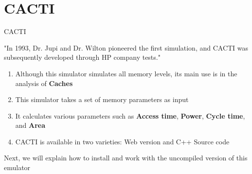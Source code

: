 \documentclass{beamer}
\begin{document}
\section{CACTI}
\begin{frame}{CACTI}
	
	"In 1993, Dr. Jupi and Dr. Wilton pioneered the first simulation, and CACTI was subsequently developed through HP company tests."
	
	\begin{enumerate}
		\item Although this simulator simulates all memory levels, its main use is in the analysis of \textbf{Caches}
		
		\item This simulator takes a set of memory parameters as input
		\item It calculates various parameters such as \textbf{Access time}, \textbf{Power}, \textbf{Cycle time}, and \textbf{Area}
		\item CACTI is available in two varieties: Web version and C++ Source code
	\end{enumerate}
	
	Next, we will explain how to install and work with the uncompiled version of this emulator

%
%        
%        
\end{frame}
\end{document}
